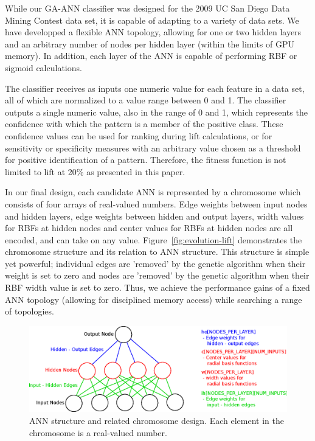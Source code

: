 \documentclass[11pt]{article}       %
\begin{document}
While our GA-ANN classifier was designed for the 2009 UC San Diego Data Mining Contest data set, it is capable of adapting to a variety of data sets.  We have developped a flexible ANN topology, allowing for one or two hidden layers and an arbitrary number of nodes per hidden layer (within the limits of GPU memory). In addition, each layer of the ANN is capable of performing RBF or sigmoid calculations.    

The classifier receives as inputs one numeric value for each feature in a data set, all of which are normalized to a value range between 0 and 1.  The classifier outputs a single numeric value, also in the range of 0 and 1, which represents the confidence with which the pattern is a member of the positive class.  These confidence values can be used for ranking during lift calculations, or for sensitivity or specificity measures with an arbitrary value chosen as a threshold for positive identification of a pattern.  Therefore, the fitness function is not limited to lift at 20\% as presented in this paper.

In our final design, each candidate ANN is represented by a chromosome which consists of four arrays of real-valued numbers. Edge weights between input nodes and hidden layers, edge weights between hidden and output layers, width values for RBFs at hidden nodes and center values for RBFs at hidden nodes are all encoded, and can take on any value. Figure~\ref{fig:evolution-lift} demonstrates the chromosome structure and its relation to ANN structure.  This structure is simple yet powerful; individual edges are 'removed' by the genetic algorithm when their weight is set to zero and nodes are 'removed' by the genetic algorithm when their RBF width value is set to zero.  Thus, we achieve the performance gains of a fixed ANN topology (allowing for disciplined memory access) while searching a range of topologies.

\begin{figure}[h]
	\centering
	\includegraphics[width=\textwidth]{ann-chromosome}
	\caption{ANN structure and related chromosome design.  Each element in the chromosome is a real-valued number.}
	\label{fig:ann-chromosome}
\end{figure}
\end{document}
